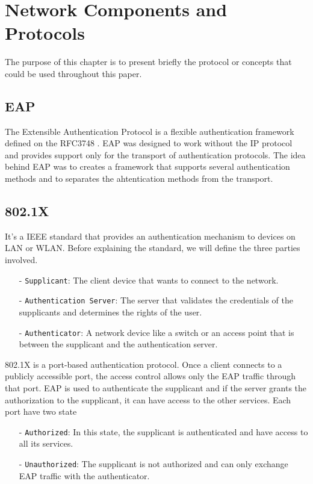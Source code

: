 
\chapter{Network Components and Protocols} %

\label{Chapter3} %


The purpose of this chapter is to present briefly the protocol or concepts that could be used throughout this paper.
\section{EAP}
The Extensible Authentication Protocol is a flexible authentication framework defined on the RFC3748 \cite{rfc3748}. EAP was designed to work without the IP protocol and provides support only for the transport of authentication protocols. The idea behind EAP was to creates a framework that supports several authentication methods and to separates the ahtentication methods from the transport.

\section{802.1X}
It's a IEEE standard that provides an authentication mechanism to devices on LAN or WLAN. Before explaining the standard, we will define the three parties involved.
\begin{itemize}
	\item[-]\texttt{Supplicant}: The client device that wants to connect to the network.
	\item[-]\texttt{Authentication Server}: The server that validates the credentials of the supplicants and determines the rights of the user.
	\item[-]\texttt{Authenticator}: A network device like a switch or an access point that is between the supplicant and the authentication server.
\end{itemize} 
802.1X is a port-based authentication protocol. Once a client connects to a publicly accessible port, the access control allows only the EAP traffic through that port. EAP is used to authenticate the supplicant and if the server grants the authorization to the supplicant, it can have access to the other services.
Each port have two state
\begin{itemize}
\item[-]\texttt{Authorized}: In this state, the supplicant is authenticated and have access to all its services.
\item[-]\texttt{Unauthorized}: The supplicant is not authorized and can only exchange EAP traffic with the authenticator.
\end{itemize}

